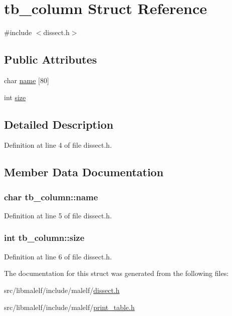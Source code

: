 \hypertarget{structtb__column}{
\section{tb\_\-column Struct Reference}
\label{structtb__column}
}


{\ttfamily \#include $<$dissect.h$>$}

\subsection*{Public Attributes}
\begin{DoxyCompactItemize}
\item 
char \hyperlink{structtb__column_a13b42eceab634d1ba925ef4c9a774dfd}{name} \mbox{[}80\mbox{]}
\item 
int \hyperlink{structtb__column_ad083bfa75780773659405cb85b8fd997}{size}
\end{DoxyCompactItemize}


\subsection{Detailed Description}


Definition at line 4 of file dissect.h.



\subsection{Member Data Documentation}
\hypertarget{structtb__column_a13b42eceab634d1ba925ef4c9a774dfd}{
\subsubsection[{name}]{\setlength{\rightskip}{0pt plus 5cm}char {\bf tb\_\-column::name}}}
\label{structtb__column_a13b42eceab634d1ba925ef4c9a774dfd}


Definition at line 5 of file dissect.h.

\hypertarget{structtb__column_ad083bfa75780773659405cb85b8fd997}{
\subsubsection[{size}]{\setlength{\rightskip}{0pt plus 5cm}int {\bf tb\_\-column::size}}}
\label{structtb__column_ad083bfa75780773659405cb85b8fd997}


Definition at line 6 of file dissect.h.



The documentation for this struct was generated from the following files:\begin{DoxyCompactItemize}
\item 
src/libmalelf/include/malelf/\hyperlink{dissect_8h}{dissect.h}\item 
src/libmalelf/include/malelf/\hyperlink{print__table_8h}{print\_\-table.h}\end{DoxyCompactItemize}

